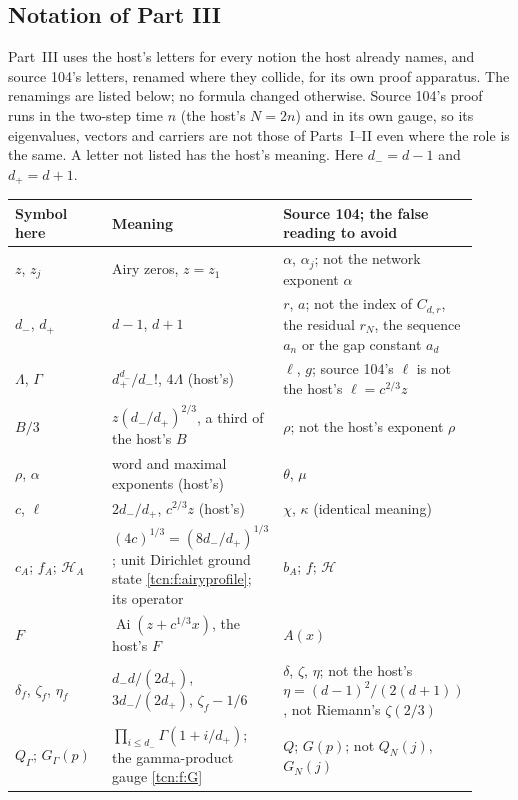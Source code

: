 \documentclass[11pt,letterpaper]{article}
\newcommand{\Ai}{\operatorname{Ai}}
\theoremstyle{remark}
\begin{document}
\subsection{Notation of Part III}\label{tcn:f:sec:notation}
Part~III uses the host's letters for every notion the host already names, and source 104's letters, renamed where they collide, for its own proof apparatus. The renamings are listed below; no formula changed otherwise. Source 104's proof runs in the two-step time $n$ (the host's $N=2n$) and in its own gauge, so its eigenvalues, vectors and carriers are not those of Parts~I--II even where the role is the same. A letter not listed has the host's meaning. Here $d_-=d-1$ and $d_+=d+1$.

\begingroup\small
\begin{longtable}{@{}>{\raggedright}p{0.24\linewidth}>{\raggedright}p{0.36\linewidth}>{\raggedright\arraybackslash}p{0.32\linewidth}@{}}
\toprule
Symbol here & Meaning & Source 104; the false reading to avoid\\
\midrule\endhead
$z$, $z_j$ & Airy zeros, $z=z_1$ & $\alpha$, $\alpha_j$; not the network exponent $\alpha$\\
$d_-$, $d_+$ & $d-1$, $d+1$ & $r$, $a$; not the index of $C_{d,r}$, the residual $r_N$, the sequence $a_n$ or the gap constant $a_d$\\
$\Lambda$, $\Gamma$ & $d_+^{d_-}/d_-!$, $4\Lambda$ (host's) & $\ell$, $g$; source 104's $\ell$ is not the host's $\ell=c^{2/3}z$\\
$B/3$ & $z(d_-/d_+)^{2/3}$, a third of the host's $B$ & $\rho$; not the host's exponent $\rho$\\
$\rho$, $\alpha$ & word and maximal exponents (host's) & $\theta$, $\mu$\\
$c$, $\ell$ & $2d_-/d_+$, $c^{2/3}z$ (host's) & $\chi$, $\kappa$ (identical meaning)\\
$c_A$; $f_A$; $\mathcal H_A$ & $(4c)^{1/3}=(8d_-/d_+)^{1/3}$; unit Dirichlet ground state \eqref{tcn:f:airyprofile}; its operator & $b_A$; $f$; $\mathcal H$\\
$F$ & $\Ai(z+c^{1/3}x)$, the host's $F$ & $A(x)$\\
$\delta_f$, $\zeta_f$, $\eta_f$ & $d_-d/(2d_+)$, $3d_-/(2d_+)$, $\zeta_f-1/6$ & $\delta$, $\zeta$, $\eta$; not the host's $\eta=(d-1)^2/(2(d+1))$, not Riemann's $\zeta(2/3)$\\
$Q_\Gamma$; $G_\Gamma(p)$ & $\prod_{i\le d_-}\Gamma(1+i/d_+)$; the gamma-product gauge \eqref{tcn:f:G} & $Q$; $G(p)$; not $Q_N(j)$, $G_N(j)$\\

\end{longtable}
\end{document}
